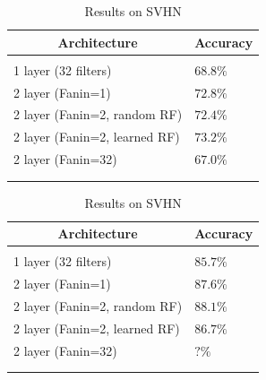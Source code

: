 \documentclass{article} %
\begin{document}
\begin {table}
\parbox{.5\linewidth}{
\caption{Results on CIFAR-10}
\label{resuts-cifar10}
\begin{center}
\begin{tabular}{ll}
\multicolumn{1}{c}{\bf Architecture}  &\multicolumn{1}{c}{\bf Accuracy}
\\ \hline \\
1 layer (32 filters)                            & $68.8\%$\\
2 layer (Fanin=1)                            &$72.8\%$ \\
2 layer (Fanin=2, random RF)            &$72.4\%$ \\
2 layer (Fanin=2, learned RF)            &$73.2\%$\\
2 layer (Fanin=32)                          &$67.0\%$\\
\\ \hline \\
\end{tabular}
\end{center}
}
\parbox{.5\linewidth}{
\caption{Results on SVHN}
\label{resuts-svhn}
\begin{center}
\begin{tabular}{ll}
\multicolumn{1}{c}{\bf Architecture}  &\multicolumn{1}{c}{\bf Accuracy}
\\ \hline \\
1 layer (32 filters)                          & $85.7\%$\\
2 layer (Fanin=1)                           &$87.6\%$ \\
2 layer (Fanin=2, random RF)           &$88.1\%$ \\
2 layer (Fanin=2, learned RF)           &$86.7\%$\\
2 layer (Fanin=32)                        &$?\%$\\
\\ \hline \\
\end{tabular}
\end{center}
}
\end{table}





\end{document}
